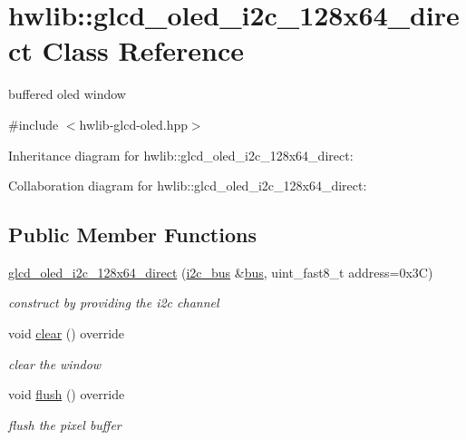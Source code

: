 \hypertarget{classhwlib_1_1glcd__oled__i2c__128x64__direct}{}\section{hwlib\+:\+:glcd\+\_\+oled\+\_\+i2c\+\_\+128x64\+\_\+direct Class Reference}
\label{classhwlib_1_1glcd__oled__i2c__128x64__direct}


buffered oled window  




{\ttfamily \#include $<$hwlib-\/glcd-\/oled.\+hpp$>$}



Inheritance diagram for hwlib\+:\+:glcd\+\_\+oled\+\_\+i2c\+\_\+128x64\+\_\+direct\+:


Collaboration diagram for hwlib\+:\+:glcd\+\_\+oled\+\_\+i2c\+\_\+128x64\+\_\+direct\+:
\subsection*{Public Member Functions}
\begin{DoxyCompactItemize}
\item 
\mbox{\label{classhwlib_1_1glcd__oled__i2c__128x64__direct_abd2cbd4ca98fe44502a471497e9e5380}} 
\hyperlink{classhwlib_1_1glcd__oled__i2c__128x64__direct_abd2cbd4ca98fe44502a471497e9e5380}{glcd\+\_\+oled\+\_\+i2c\+\_\+128x64\+\_\+direct} (\hyperlink{classhwlib_1_1i2c__bus}{i2c\+\_\+bus} \&\hyperlink{classhwlib_1_1ssd1306__i2c_a6dd727643c4b270cc364cd6e00ec84e9}{bus}, uint\+\_\+fast8\+\_\+t address=0x3\+C)
\begin{DoxyCompactList}\small\item\em construct by providing the i2c channel \end{DoxyCompactList}\item 
void \hyperlink{classhwlib_1_1glcd__oled__i2c__128x64__direct_a283c1ff2e898f5f2b23dfdce6209b55e}{clear} () override
\begin{DoxyCompactList}\small\item\em clear the window \end{DoxyCompactList}\item 
void \hyperlink{classhwlib_1_1glcd__oled__i2c__128x64__direct_a65a496d65b3a99fe9334e0981b706533}{flush} () override
\begin{DoxyCompactList}\small\item\em flush the pixel buffer \end{DoxyCompactList}\end{DoxyCompactItemize}
